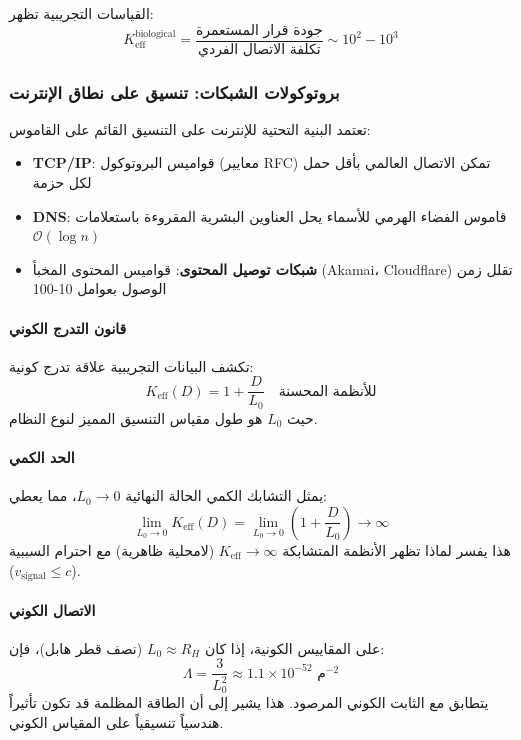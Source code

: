 \documentclass[11pt,a4paper]{article}
\begin{document}
	القياسات التجريبية تظهر:
	\begin{equation}
		K_{\mathrm{eff}}^{\text{biological}} = \frac{\text{جودة قرار المستعمرة}}{\text{تكلفة الاتصال الفردي}} \sim 10^2 - 10^3
	\end{equation}
	
	\subsubsection{بروتوكولات الشبكات: تنسيق على نطاق الإنترنت}
	تعتمد البنية التحتية للإنترنت على التنسيق القائم على القاموس:
	\begin{itemize}
		\item \textbf{TCP/IP}: قواميس البروتوكول (معايير RFC) تمكن الاتصال العالمي بأقل حمل لكل حزمة
		\item \textbf{DNS}: قاموس الفضاء الهرمي للأسماء يحل العناوين البشرية المقروءة باستعلامات $\mathcal{O}(\log n)$
		\item \textbf{شبكات توصيل المحتوى}: قواميس المحتوى المخبأ (Akamai، Cloudflare) تقلل زمن الوصول بعوامل 10-100
	\end{itemize}
	
	\paragraph{قانون التدرج الكوني}
	تكشف البيانات التجريبية علاقة تدرج كونية:
	\begin{equation}
		\boxed{K_{\mathrm{eff}}(D) = 1 + \frac{D}{L_0} \quad \text{للأنظمة المحسنة}}
	\end{equation}
	حيث $L_0$ هو طول مقياس التنسيق المميز لنوع النظام.
	
	\paragraph{الحد الكمي}
	يمثل التشابك الكمي الحالة النهائية $L_0 \to 0$، مما يعطي:
	\begin{equation}
		\lim_{L_0 \to 0} K_{\mathrm{eff}}(D) = \lim_{L_0 \to 0} \left(1 + \frac{D}{L_0}\right) \to \infty
	\end{equation}
	هذا يفسر لماذا تظهر الأنظمة المتشابكة $K_{\mathrm{eff}} \to \infty$ (لامحلية ظاهرية) مع احترام السببية ($v_{\text{signal}} \leq c$).
	
	\paragraph{الاتصال الكوني}
	على المقاييس الكونية، إذا كان $L_0 \approx R_H$ (نصف قطر هابل)، فإن:
	\begin{equation}
		\Lambda = \frac{3}{L_0^2} \approx 1.1 \times 10^{-52} \text{ م}^{-2}
	\end{equation}
	يتطابق مع الثابت الكوني المرصود. هذا يشير إلى أن الطاقة المظلمة قد تكون تأثيراً هندسياً تنسيقياً على المقياس الكوني.
	
\end{document}
